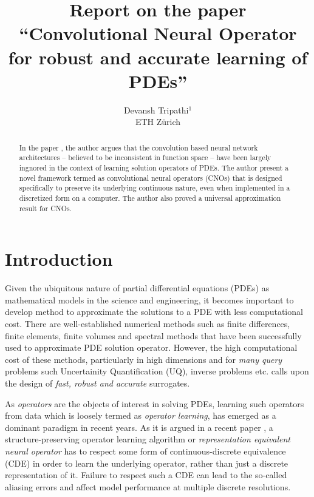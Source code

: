 \documentclass[reqno,10pt]{amsart}
\title{Report on the paper ``Convolutional Neural Operator for robust and accurate learning of PDEs''}
\author{Devansh Tripathi$^1$ \\ ETH Z\lowercase{\"urich}}
\theoremstyle{plain}
\theoremstyle{definition}
\begin{document}

\begin{abstract}
    In the paper \cite{BR2023}, the author argues that the convolution based neural network architectures -- believed to be inconsistent in function space -- have been largely ingnored in the context of learning solution operators of PDEs. The author present a novel framework termed as convolutional neural operators (CNOs) that is designed specifically to preserve its underlying continuous nature, even when implemented in a discretized form on a computer. The author also proved a universal approximation result for CNOs.
\end{abstract}
\maketitle
\section{\bf \large Introduction}
    Given the ubiquitous nature of partial differential equations (PDEs) as mathematical models in the science and engineering, it becomes important to develop method to approximate the solutions to a PDE with less computational cost. There are well-established numerical methods such as finite differences, finite elements, finite volumes and spectral methods that have been successfully used to approximate PDE solution operator. However, the high computational cost of these methods, particularly in high dimensions and for {\it many query} problems such Uncertainity Quantification (UQ), inverse problems etc. calls upon the design of {\it fast, robust and accurate} surrogates.

    \noindent As {\it operators} are the objects of interest in solving PDEs, learning such operators from data which is loosely termed as {\it operator learning}, has emerged as a dominant paradigm in recent years. As it is argued in a recent paper \cite{FB2023}, a structure-preserving operator learning algorithm or {\it representation equivalent neural operator} has to respect some form of continuous-discrete equivalence (CDE) in order to learn the underlying operator, rather than just a discrete representation of it. Failure to respect such a CDE can lead to the so-called aliasing errors \cite{FB2023} and affect model performance at multiple discrete resolutions.
\end{document}
